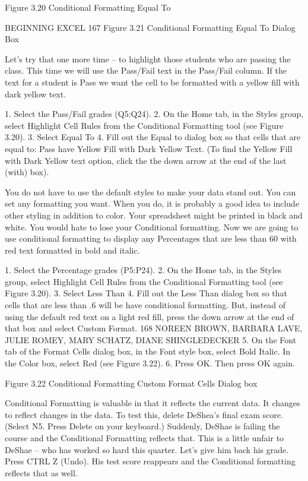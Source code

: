 Figure 3.20 Conditional Formatting Equal To




BEGINNING EXCEL 167
Figure 3.21 Conditional Formatting Equal To Dialog Box


Let’s try that one more time – to highlight those students who are passing the class. This time we will
use the Pass/Fail text in the Pass/Fail column. If the text for a student is Pass we want the cell to be
formatted with a yellow fill with dark yellow text.

1. Select the Pass/Fail grades (Q5:Q24).
2. On the Home tab, in the Styles group, select Highlight Cell Rules from the Conditional
Formatting tool (see Figure 3.20).
3. Select Equal To
4. Fill out the Equal to dialog box so that cells that are equal to: Pass have Yellow Fill with Dark
Yellow Text. (To find the Yellow Fill with Dark Yellow text option, click the the down arrow at
the end of the last (with) box).

You do not have to use the default styles to make your data stand out. You can set any formatting
you want. When you do, it is probably a good idea to include other styling in addition to color. Your
spreadsheet might be printed in black and white. You would hate to lose your Conditional formatting.
Now we are going to use conditional formatting to display any Percentages that are less than 60%
with red text formatted in bold and italic.

1. Select the Percentage grades (P5:P24).
2. On the Home tab, in the Styles group, select Highlight Cell Rules from the Conditional
Formatting tool (see Figure 3.20).
3. Select Less Than
4. Fill out the Less Than dialog box so that cells that are less than .6 will be have conditional
formatting. But, instead of using the default red text on a light red fill, press the down arrow at
the end of that box and select Custom Format.
168 NOREEN BROWN, BARBARA LAVE, JULIE ROMEY, MARY SCHATZ, DIANE SHINGLEDECKER
5. On the Font tab of the Format Cells dialog box, in the Font style box, select Bold Italic. In the
Color box, select Red (see Figure 3.22).
6. Press OK. Then press OK again.




Figure 3.22 Conditional Formatting Custom Format Cells Dialog box


Conditional Formatting is valuable in that it reflects the current data. It changes to reflect changes in
the data. To test this, delete DeShea’s final exam score. (Select N5. Press Delete on your keyboard.)
Suddenly, DeShae is failing the course and the Conditional Formatting reflects that. This is a little
unfair to DeShae – who has worked so hard this quarter. Let’s give him back his grade. Press CTRL Z
(Undo). His test score reappears and the Conditional formatting reflects that as well.

